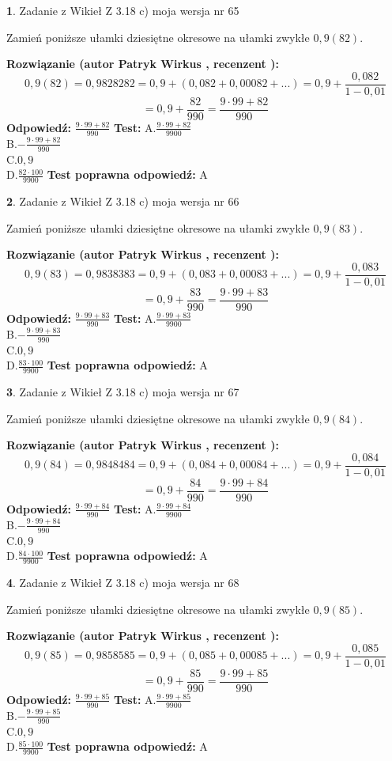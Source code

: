 \documentclass[12pt, a4paper]{article}
\theoremstyle{definition} %
\newtheorem{zad}{}
\newcommand{\zadStart}[1]{\begin{zad}#1\newline}
\newcommand{\zadStop}{\end{zad}}
\newcommand{\rozwStart}[2]{\noindent \textbf{Rozwiązanie (autor #1 , recenzent #2): }\newline}
\newcommand{\rozwStop}{\newline}
\newcommand{\odpStart}{\noindent \textbf{Odpowiedź:}\newline}
\newcommand{\odpStop}{\newline}
\newcommand{\testStart}{\noindent \textbf{Test:}\newline}
\newcommand{\testStop}{\newline}
\newcommand{\kluczStart}{\noindent \textbf{Test poprawna odpowiedź:}\newline}
\newcommand{\kluczStop}{\newline}
\begin{document}
\zadStart{Zadanie z Wikieł Z 3.18 c) moja wersja nr 65}

Zamień poniższe ułamki dziesiętne okresowe na ułamki zwykłe $0,9(82)$.
\zadStop
\rozwStart{Patryk Wirkus}{}
$$0,9(82)=0,9828282=0,9+(0,082+0,00082+...)=0,9+\frac{0,082}{1-0,01}$$
$$=0,9+\frac{82}{990}=\frac{9\cdot99+82}{990}$$
\rozwStop
\odpStart
$\frac{9\cdot99+82}{990}$
\odpStop
\testStart
A.$\frac{9\cdot99+82}{9900}$\\ B.$-\frac{9\cdot99+82}{990}$\\ C.$0,9$\\ D.$\frac{82\cdot100}{9900}$
\testStop
\kluczStart
A
\kluczStop



\zadStart{Zadanie z Wikieł Z 3.18 c) moja wersja nr 66}

Zamień poniższe ułamki dziesiętne okresowe na ułamki zwykłe $0,9(83)$.
\zadStop
\rozwStart{Patryk Wirkus}{}
$$0,9(83)=0,9838383=0,9+(0,083+0,00083+...)=0,9+\frac{0,083}{1-0,01}$$
$$=0,9+\frac{83}{990}=\frac{9\cdot99+83}{990}$$
\rozwStop
\odpStart
$\frac{9\cdot99+83}{990}$
\odpStop
\testStart
A.$\frac{9\cdot99+83}{9900}$\\ B.$-\frac{9\cdot99+83}{990}$\\ C.$0,9$\\ D.$\frac{83\cdot100}{9900}$
\testStop
\kluczStart
A
\kluczStop



\zadStart{Zadanie z Wikieł Z 3.18 c) moja wersja nr 67}

Zamień poniższe ułamki dziesiętne okresowe na ułamki zwykłe $0,9(84)$.
\zadStop
\rozwStart{Patryk Wirkus}{}
$$0,9(84)=0,9848484=0,9+(0,084+0,00084+...)=0,9+\frac{0,084}{1-0,01}$$
$$=0,9+\frac{84}{990}=\frac{9\cdot99+84}{990}$$
\rozwStop
\odpStart
$\frac{9\cdot99+84}{990}$
\odpStop
\testStart
A.$\frac{9\cdot99+84}{9900}$\\ B.$-\frac{9\cdot99+84}{990}$\\ C.$0,9$\\ D.$\frac{84\cdot100}{9900}$
\testStop
\kluczStart
A
\kluczStop



\zadStart{Zadanie z Wikieł Z 3.18 c) moja wersja nr 68}

Zamień poniższe ułamki dziesiętne okresowe na ułamki zwykłe $0,9(85)$.
\zadStop
\rozwStart{Patryk Wirkus}{}
$$0,9(85)=0,9858585=0,9+(0,085+0,00085+...)=0,9+\frac{0,085}{1-0,01}$$
$$=0,9+\frac{85}{990}=\frac{9\cdot99+85}{990}$$
\rozwStop
\odpStart
$\frac{9\cdot99+85}{990}$
\odpStop
\testStart
A.$\frac{9\cdot99+85}{9900}$\\ B.$-\frac{9\cdot99+85}{990}$\\ C.$0,9$\\ D.$\frac{85\cdot100}{9900}$
\testStop
\kluczStart
A
\kluczStop
\end{document}
